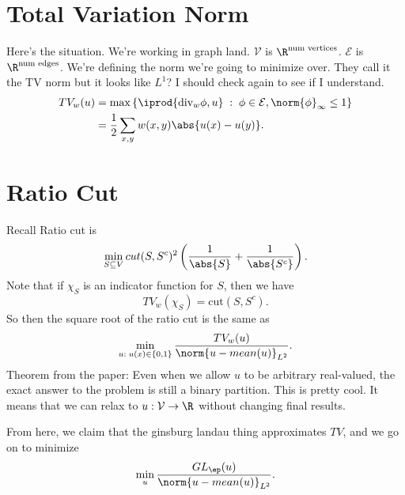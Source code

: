 \documentclass{article}
\newcommand{\dive}[0]{\text{div}}
\begin{document}
\section{Total Variation Norm}

Here's the situation. We're working in graph land. $\mathcal{V}$ is $\R^{\text{num vertices}}$. $\mathcal{E}$ is $\R^{\text{num edges}}$. We're defining the norm we're going to minimize over. They call it the TV norm but it looks like $L^1$? I should check again to see if I understand.
\begin{align}
  TV_w(u) &= \max\left\{\iprod{\dive_w\phi, u}\;:\;\phi \in \mathcal{E}, \norm{\phi}_{\infty} \leq 1\right\} \\
          & = \frac{1}{2}\sum_{x,y} w(x,y)\abs{u(x) - u(y)}.
\end{align}

\section{Ratio Cut}

Recall Ratio cut is
\[\min_{S\subseteq V}cut(S,S^c)^2\left(\frac{1}{\abs{S}} + \frac{1}{\abs{S^c}}\right).\]
Note that if $\chi_S$ is an indicator function for $S$, then we have
\[TV_w(\chi_S) = \text{cut}\left(S,S^c\right).\]
So then the square root of the ratio cut is the same as
\[\min_{u:\; u(x)\in\{0,1\}}\frac{TV_w(u)}{\norm{u - mean(u)}_{L^2}}.\]
Theorem from the paper: Even when we allow $u$ to be arbitrary real-valued, the exact answer to the problem is still a binary partition. This is pretty cool. It means that we can relax to $u: \mathcal{V} \to \R$ without changing final results.

From here, we claim that the ginsburg landau thing approximates $TV$, and we go on to minimize
\[\min_u \frac{GL_\ep(u)}{\norm{u - mean(u)}_{L^2}}.\]
\end{document}
